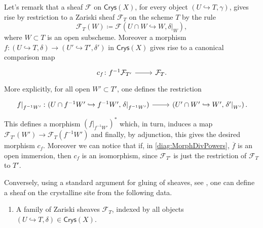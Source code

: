 \begin{rem}\label{rem:SheavesCrysX}
	Let's remark that a sheaf $\mathcal{F}$ on $\mathsf{Crys}(X)$, for every
	object $\left(U \hookrightarrow T, \gamma\right)$, gives rise by restriction
	to a Zariski sheaf $\mathcal{F}_T$ on the scheme $T$ by the rule
	\begin{equation*}
	\mathcal{F}_T(W) \coloneqq
	\mathcal{F}(U \cap W \hookrightarrow W, \left.\delta\right|_{W})
	,\end{equation*}
	where $W \subset T$ is an open subscheme.
	Moreover a morphism 
	$f\colon \left(U \hookrightarrow T, \delta\right) \to
	\left(U' \hookrightarrow T', \delta'\right)$
	in $\mathsf{Crys}(X)$
	gives rise to a canonical comparison map
	\begin{equation*}
	\begin{tikzcd}[row sep = 0ex
		,/tikz/column 1/.append style={anchor=base east}
		,/tikz/column 2/.append style={anchor=base west}]
		c_f\colon f^{-1}\mathcal{F}_{T'} \arrow[r, "", rightarrow] &
		\mathcal{F}_T
	.\end{tikzcd}
	\end{equation*} 
	More explicitly, for all open $W' \subset T'$, one defines the restriction
	\begin{equation*}
	\begin{tikzcd}[row sep = 0ex
		,/tikz/column 1/.append style={anchor=base east}
		,/tikz/column 2/.append style={anchor=base west}]
		\left.f\right|_{f^{-1}W'}\colon 
		(U \cap f^{-1}W' \hookrightarrow f^{-1}W', \left.\delta\right|_{f^{-1}W'} )
		\arrow[r, "", rightarrow] &
		\left(U' \cap W' \hookrightarrow W', \left.\delta'\right|_{W'} \right)
	.\end{tikzcd}
	\end{equation*} 
	This defines a morphism $(\left.f\right|_{f^{-1}W'})^*$
	which, in turn, induces a map $\mathcal{F}_{T'}(W') \to \mathcal{F}_T(f^{-1}W')$
	and finally, by adjunction, this gives the desired morphism $c_f$.
	Moreover we can notice that if, in \cref{diag:MorphDivPowers},
	$\overline{f}$ is an open immersion, then
	$c_f$ is an isomorphism, since $\mathcal{F}_{T'}$ is just the restriction
	of $\mathcal{F}_T$ to $T'$.

	Conversely, using a standard argument for gluing of sheaves, see 
	\cite[\href{https://stacks.math.columbia.edu/tag/07IN}{Section 07IN}]{SP},
	one can define a sheaf on the crystalline site from the following data.
	\begin{enumerate}
		\item A family of Zariski sheaves $\mathcal{F}_T$, indexed by 
			all objects $\left(U \hookrightarrow T, \delta\right) \in \mathsf{Crys}(X)$.


\end{enumerate}
\end{rem}

